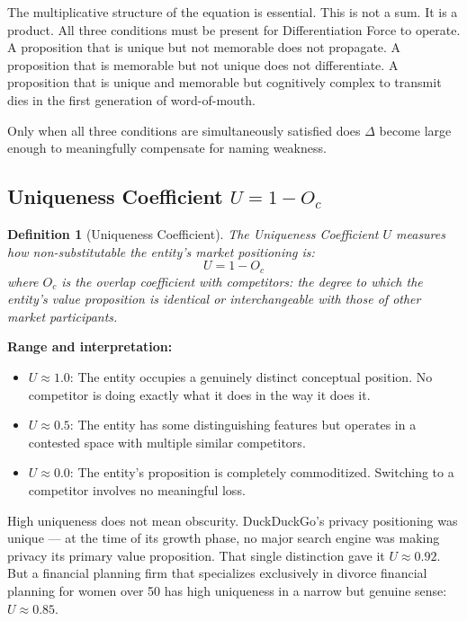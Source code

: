 \documentclass[12pt, openany]{book}
\theoremstyle{thmstyle}
\theoremstyle{defstyle}
\newtheorem{definition}{Definition}[chapter]
\begin{document}
The multiplicative structure of the equation is essential. This is not a sum. It is a product. All three conditions must be present for Differentiation Force to operate. A proposition that is unique but not memorable does not propagate. A proposition that is memorable but not unique does not differentiate. A proposition that is unique and memorable but cognitively complex to transmit dies in the first generation of word-of-mouth.

Only when all three conditions are simultaneously satisfied does $\Delta$ become large enough to meaningfully compensate for naming weakness.

\subsection{Uniqueness Coefficient $U = 1 - O_c$}

\begin{definition}[Uniqueness Coefficient]
The Uniqueness Coefficient $U$ measures how non-substitutable the entity's market positioning is:
\begin{equation}
U = 1 - O_c
\label{eq:uniqueness}
\end{equation}
where $O_c$ is the overlap coefficient with competitors: the degree to which the entity's value proposition is identical or interchangeable with those of other market participants.
\end{definition}

\textbf{Range and interpretation:}
\begin{itemize}[leftmargin=1.5em]
  \item $U \approx 1.0$: The entity occupies a genuinely distinct conceptual position. No competitor is doing exactly what it does in the way it does it.
  \item $U \approx 0.5$: The entity has some distinguishing features but operates in a contested space with multiple similar competitors.
  \item $U \approx 0.0$: The entity's proposition is completely commoditized. Switching to a competitor involves no meaningful loss.
\end{itemize}

High uniqueness does not mean obscurity. DuckDuckGo's privacy positioning was unique --- at the time of its growth phase, no major search engine was making privacy its primary value proposition. That single distinction gave it $U \approx 0.92$. But a financial planning firm that specializes exclusively in divorce financial planning for women over 50 has high uniqueness in a narrow but genuine sense: $U \approx 0.85$.
\end{document}
